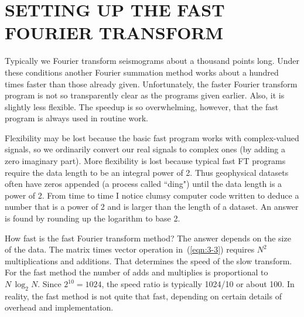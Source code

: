 \section{SETTING UP THE FAST FOURIER TRANSFORM }
Typically we Fourier transform seismograms about a thousand points long.
Under these conditions another Fourier summation method
works about a hundred times faster than those already given.
Unfortunately, the faster Fourier transform program
is not so transparently clear as the programs given earlier.
Also, it is slightly less flexible.
The speedup is so overwhelming, however,
that the fast program is always used in routine work.
\par
Flexibility may be lost because the basic fast program
works with complex-valued signals,
so we ordinarily convert our real signals to complex ones
(by adding a zero imaginary part).
More flexibility is lost because typical fast FT programs require
the data length to be an integral power of 2.
Thus geophysical datasets often
have zeros appended (a process called ``ding")
until the data length is a power of 2.
From time to time I notice clumsy computer code written to deduce
a number that is a power of 2 and is larger than the
length of a dataset.
An answer is found by rounding up the logarithm to base 2.
\par
How fast is the fast Fourier transform method?
The answer depends on the size of the data.
The matrix times vector operation in~(\ref{eqn:3-3})
requires $N^2$ multiplications and additions.
That determines the speed of the slow transform.
For the fast method the number of adds and multiplies
is proportional to $N \,\log_2 N$.
Since $2^{10}=1024$, the speed ratio is typically 1024/10 or about 100.
In reality, the fast method is not quite that fast,
depending on certain details of overhead and implementation.
\par
\begin{comment}
Below is {\tt ftu()}, a version of the \bx{fast Fourier transform} program.
\sx{Fourier transform!fast}
There are many versions of the program---I have chosen
this one for its simplicity.
Considering the complexity of the task,
it is remarkable that no auxiliary memory vectors are required;
indeed, the output vector lies on top of the input vector.
To run this program, your first step might be to copy
your real-valued signal into a complex-valued array.
Then append enough zeros to fill in the remaining space.%
\progdex{ftu}{unitary FT}
\par
The following two lines serve to Fourier transform
a vector of 1024 complex-valued points,
and then to \bx{inverse Fourier transform} them back to the original data:
\sx{Fourier transform!inverse}
\begin{verbatim}
    call ftu(  1., 1024, cx)
    call ftu( -1., 1024, cx)
 \end{verbatim}
\par
\end{comment}
